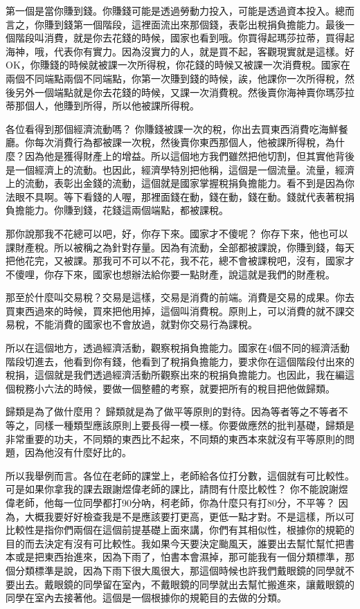 \documentclass[oneside,sub3section]{ctexbook}
\begin{document}
第一個是當你賺到錢。你賺錢可能是透過勞動力投入，可能是透過資本投入。總而言之，你賺到錢第一個階段，這裡面流出來那個錢，表彰出稅捐負擔能力。最後一個階段叫消費，就是你去花錢的時候，國家也看到哦。你買得起瑪莎拉蒂，買得起海神，哦，代表你有實力。因為沒實力的人，就是買不起，客觀現實就是這樣。好OK，你賺錢的時候就被課一次所得稅，你花錢的時候又被課一次消費稅。國家在兩個不同端點兩個不同端點，你第一次賺到錢的時候，誒，他課你一次所得稅，然後另外一個端點就是你去花錢的時候，又課一次消費稅。然後賣你海神賣你瑪莎拉蒂那個人，他賺到所得，所以他被課所得稅。

各位看得到那個經濟流動嗎？ 你賺錢被課一次的稅，你出去買東西消費吃海鮮餐廳。你每次消費行為都被課一次稅，然後賣你東西那個人，他被課所得稅，為什麼？因為他是獲得財產上的增益。所以這個地方我們雖然把他切割，但其實他背後是一個經濟上的流動。也因此，經濟學特別把他稱，這個是一個流量。流量，經濟上的流動，表彰出金錢的流動，這個就是國家掌握稅捐負擔能力。看不到是因為你法眼不具啊。等下看錢的人喔，那裡面錢在動，錢在動，錢在動。錢就代表著稅捐負擔能力。你賺到錢，花錢這兩個端點，都被課稅。

那你說那我不花總可以吧，好，你存下來。國家才不傻呢？ 你存下來，他也可以課財產稅。所以被稱之為針對存量。因為有流動，全部都被課說，你賺到錢，每天把他花完，又被課。那我可不可以不花，我不花，總不會被課稅吧，沒有，國家才不傻哩，你存下來，國家也想辦法給你要一點財產，說這就是我們的財產稅。

那至於什麼叫交易稅？交易是這樣，交易是消費的前端。消費是交易的成果。你去買東西過來的時候，買來把他用掉，這個叫消費稅。原則上，可以消費的就不課交易稅，不能消費的國家也不會放過，就對你交易行為課稅。

所以在這個地方，透過經濟活動，觀察稅捐負擔能力。國家在4個不同的經濟活動階段切進去，他看到你有錢，他看到了稅捐負擔能力，要求你在這個階段付出來的稅捐，這個就是我們透過經濟活動所觀察出來的稅捐負擔能力。也因此，我在編這個稅務小六法的時候，要做一個整體的考察，就要把所有的稅目把他做歸類。

歸類是為了做什麼用？ 歸類就是為了做平等原則的對待。因為等者等之不等者不等之，同樣一種類型應該原則上要長得一模一樣。你要做應然的批判基礎，歸類是非常重要的功夫，不同類的東西比不起來，不同類的東西本來就沒有平等原則的問題，因為他沒有什麼好比的。

所以我舉例而言。各位在老師的課堂上，老師給各位打分數，這個就有可比較性。可是如果你拿我的課去跟謝煜偉老師的課比，請問有什麼比較性？ 你不能說謝煜偉老師，他每一位同學都打90分吶，柯老師，你為什麼只有打80分，不平等？ 因為，大概我要好好檢查我是不是應該要打更高，更低一點才對。不是這樣，所以可比較性是指你們兩個在這個前提基礎上面來講，你們有其相似性，根據你的規範的目的而去決定有沒有可比較性。我如果今天要決定颱風天，誰要出去幫忙幫忙把書本或是把東西抬進來，因為下雨了，怕書本會濕掉，那可能我有一個分類標準，那個分類標準是說，因為下雨下很大風很大，那這個時候也許我們戴眼鏡的同學就不要出去。戴眼鏡的同學留在室內，不戴眼鏡的同學就出去幫忙搬進來，讓戴眼鏡的同學在室內去接著他。這個是一個根據你的規範目的去做的分類。
\end{document}
